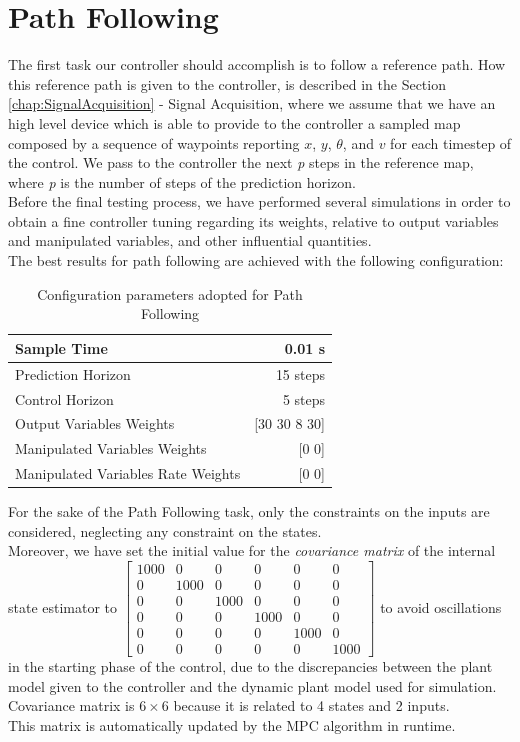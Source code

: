 \section{Path Following}
\label{chap:path_following}
The first task our controller should accomplish is to follow a reference path.
How this reference path is given to the controller, is described in the Section \ref{chap:SignalAcquisition} - Signal Acquisition, where we assume that we have an high level device which is able to provide to the controller a sampled map composed by a sequence of waypoints reporting $x$, $y$, $\theta$, and $v$ for each timestep of the control. We pass to the controller the next \textit{p} steps in the reference map, where \textit{p} is the number of steps of the prediction horizon.\\
Before the final testing process, we have performed several simulations in order to obtain a fine controller tuning regarding its weights, relative to output variables and manipulated variables, and other influential quantities. \\
The best results for path following are achieved with the following configuration:
\begin{table}[H]
\centering
\begin{tabular}{|l|r|}\hline
Sample Time                        & 0.01 s           \\ \hline
Prediction Horizon                 & 15 steps         \\ \hline
Control Horizon                    & 5 steps          \\ \hline
Output Variables Weights           & {[}30 30 8 30{]} \\ \hline
Manipulated Variables Weights      & {[}0 0{]}        \\ \hline
Manipulated Variables Rate Weights & {[}0 0{]}       \\ \hline
\end{tabular}
\caption{Configuration parameters adopted for Path Following}
\label{tab:configuration}
\end{table}
For the sake of the Path Following task, only the constraints on the inputs are considered, neglecting any constraint on the states.\\
Moreover, we have set the initial value for the \textit{covariance matrix} of the internal state estimator to $\left[ \begin{smallmatrix} 1000 & 0 & 0 & 0 & 0 & 0 \\0 & 1000 & 0 & 0 & 0 & 0 \\0 & 0 & 1000 & 0 & 0 & 0 \\ 0 & 0 & 0 & 1000 & 0 & 0 \\ 0 & 0 & 0 & 0 & 1000 & 0 \\ 0 & 0 & 0 & 0 & 0 & 1000 \end{smallmatrix} \right] $ to avoid oscillations in the starting phase of the control, due to the discrepancies between the plant model given to the controller and the dynamic plant model used for simulation.
Covariance matrix is $6\times 6$ because it is related to 4 states and 2 inputs.\\
This matrix is automatically updated by the MPC algorithm in runtime.
